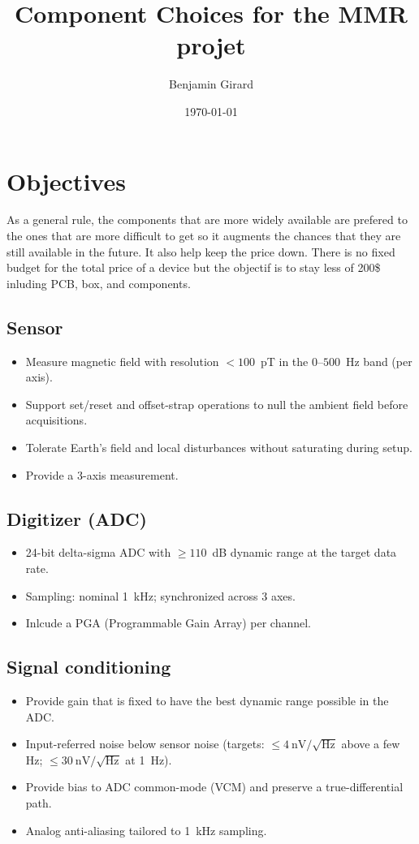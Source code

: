 \documentclass[11pt]{article}
\title{Component Choices for the MMR projet}
\author{Benjamin Girard}
\date{\today}
\begin{document}
\maketitle

\tableofcontents
\newpage

\section{Objectives}
As a general rule, the components that are more widely available are prefered to the ones
that are more difficult to get so it augments the chances that they are still available 
in the future. It also help keep the price down. 
There is no fixed budget for the total price of a device but the objectif is to stay less 
of 200\$ inluding PCB, box, and components. 
 

\subsection{Sensor}
\begin{itemize}
  \item Measure magnetic field with resolution $<\!100$~pT in the $0$--$500$~Hz band (per axis).
  \item Support set/reset and offset-strap operations to null the ambient field before acquisitions.
  \item Tolerate Earth’s field and local disturbances without saturating during setup.
  \item Provide a 3-axis measurement.
\end{itemize}

\subsection{Digitizer (ADC)}
\begin{itemize}
  \item 24-bit delta-sigma ADC with $\geq 110$~dB dynamic range at the target data rate.
  \item Sampling: nominal 1~kHz; synchronized across 3 axes.
  \item Inlcude a PGA (Programmable Gain Array) per channel.
\end{itemize}

\subsection{Signal conditioning}
\begin{itemize}
  \item Provide gain that is fixed to have the best dynamic range possible in the ADC.
  \item Input-referred noise below sensor noise (targets: $\leq 4~\mathrm{nV}/\sqrt{\mathrm{Hz}}$ 
  above a few Hz; $\leq 30~\mathrm{nV}/\sqrt{\mathrm{Hz}}$ at 1~Hz).
  \item Provide bias to ADC common-mode (VCM) and preserve a true-differential path.
  \item Analog anti-aliasing tailored to 1~kHz sampling.
\end{itemize}
\end{document}
